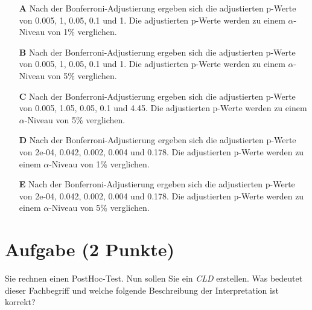 \documentclass[a4paper, 9pt]{scrartcl}\usepackage[]{graphicx}\usepackage[]{xcolor}
\begin{document}
\begin{enumerate}
\item [\textbf{A} \msquare] Nach der Bonferroni-Adjustierung ergeben sich die adjustierten p-Werte von 0.005, 1, 0.05, 0.1 und 1. Die adjustierten p-Werte werden zu einem $\alpha$-Niveau von 1\% verglichen.
\item [\textbf{B} \msquare] Nach der Bonferroni-Adjustierung ergeben sich die adjustierten p-Werte von 0.005, 1, 0.05, 0.1 und 1. Die adjustierten p-Werte werden zu einem $\alpha$-Niveau von 5\% verglichen.
\item [\textbf{C} \msquare] Nach der Bonferroni-Adjustierung ergeben sich die adjustierten p-Werte von 0.005, 1.05, 0.05, 0.1 und 4.45. Die adjustierten p-Werte werden zu einem $\alpha$-Niveau von 5\% verglichen.
\item [\textbf{D} \msquare] Nach der Bonferroni-Adjustierung ergeben sich die adjustierten p-Werte von 2e-04, 0.042, 0.002, 0.004 und 0.178. Die adjustierten p-Werte werden zu einem $\alpha$-Niveau von 1\% verglichen.
\item [\textbf{E} \msquare] Nach der Bonferroni-Adjustierung ergeben sich die adjustierten p-Werte von 2e-04, 0.042, 0.002, 0.004 und 0.178. Die adjustierten p-Werte werden zu einem $\alpha$-Niveau von 5\% verglichen.
\end{enumerate}

\section{Aufgabe \hfill (2 Punkte)}



Sie rechnen einen PostHoc-Test. Nun sollen Sie ein \textit{CLD} erstellen. Was bedeutet dieser Fachbegriff und welche folgende Beschreibung der Interpretation ist korrekt?
\end{document}
